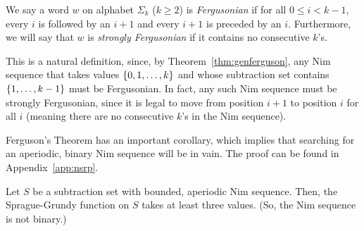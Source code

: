 \documentclass[english,12pt]{article}
\begin{document}
\begin{defin}\label{def:ferg}
We say a word $w$ on alphabet $\Sigma_k$ ($k\geq2$) is \emph{Fergusonian} if for all $0\leq i<k-1$, every $i$ is followed by an $i+1$ and every $i+1$ is preceded by an $i$.  Furthermore, we will say that $w$ is \emph{strongly Fergusonian} if it contains no consecutive $k$'s.
\end{defin}
This is a natural definition, since, by Theorem~\ref{thm:genferguson}, any Nim sequence that takes values $\left\{0,1,\ldots, k\right\}$ and whose subtraction set contains $\left\{1,\ldots,k-1\right\}$ must be Fergusonian.  In fact, any such Nim sequence must be strongly Fergusonian, since it is legal to move from position $i+1$ to position $i$ for all $i$ (meaning there are no consecutive $k$'s in the Nim sequence).  

Ferguson's Theorem has an important corollary, which implies that searching for an aperiodic, binary Nim sequence will be in vain.  The proof can be found in Appendix~\ref{app:nsrp}.
\begin{cor}\label{cor:ternary}
Let $S$ be a subtraction set with bounded, aperiodic Nim sequence.  Then, the Sprague-Grundy function on $S$ takes at least three values.  (So, the Nim sequence is not binary.)
\end{cor}
\end{document}
